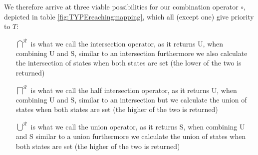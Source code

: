 We therefore arrive at three viable possibilities for our combination operator $\circ$, depicted in table \ref{fig:TYPEreachingmapping}, which all (except one) give priority to $T$:
\begin{itemize}
\item [$\bigcap^{\mathcal{R}}$] is what we call the intersection operator, as it returns U, when combining U and S, similar to an intersection furthermore we also calculate the intersection of states when both states are set (the lower of the two is returned)
\item [$\bigsqcap^{\mathcal{R}}$] is what we call the half intersection operator, as it returns U, when combining U and S, similar to an intersection but we calculate the union of states when both states are set (the higher of the two is returned)
\item [$\bigcup^{\mathcal{R}}$] is what we call the union operator, as it returns S, when combining U and S similar to a union
furthermore we calculate the union of states when both states are set (the higher of the two is returned)
\end{itemize}

\begin{table}

\caption{Different mappings for combining two reaching state values in horizontal matching for the \emph{type} policy}
\label{fig:TYPEreachingmapping}
\end{table}


